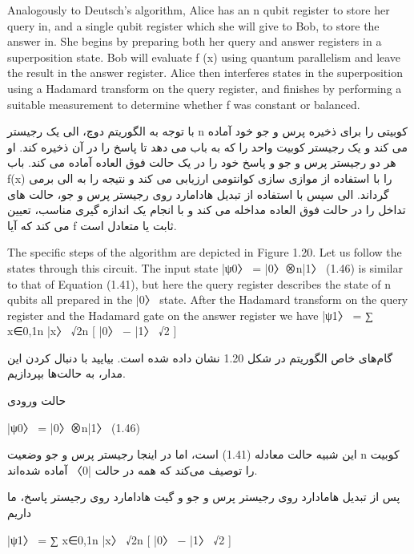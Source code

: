 \documentclass{book}
\begin{document}
	Analogously to Deutsch’s algorithm, Alice has an n qubit register to store her query
	in, and a single qubit register which she will give to Bob, to store the answer in. She
	begins by preparing both her query and answer registers in a superposition state. Bob
	will evaluate f (x) using quantum parallelism and leave the result in the answer register.
	Alice then interferes states in the superposition using a Hadamard transform on the query
	register, and finishes by performing a suitable measurement to determine whether f was
	constant or balanced.
	
	
	با توجه به الگوریتم دوچ، الی یک رجیستر n کوبیتی را برای ذخیره پرس و جو خود آماده می کند و یک رجیستر کوبیت واحد را که به باب می دهد تا پاسخ را در آن ذخیره کند. او هر دو رجیستر پرس و جو و پاسخ خود را در یک حالت فوق العاده آماده می کند. باب f(x) را با استفاده از موازی سازی کوانتومی ارزیابی می کند و نتیجه را به الی برمی گرداند. الی سپس با استفاده از تبدیل هادامارد روی رجیستر پرس و جو، حالت های تداخل را در حالت فوق العاده مداخله می کند و با انجام یک اندازه گیری مناسب، تعیین می کند که آیا f ثابت یا متعادل است.
	
	
	
	
	
	
	The specific steps of the algorithm are depicted in Figure 1.20. Let us follow the states
	through this circuit. The input state
	|ψ0〉 = |0〉⊗n|1〉 (1.46)
	is similar to that of Equation (1.41), but here the query register describes the state of n
	qubits all prepared in the |0〉 state. After the Hadamard transform on the query register
	and the Hadamard gate on the answer register we have
	|ψ1〉 = ∑
	x∈{0,1}n
	|x〉
	√2n
	[ |0〉 − |1〉
	√2
	]
	
	
	
	گام‌های خاص الگوریتم در شکل 1.20 نشان داده شده است. بیایید با دنبال کردن این مدار، به حالت‌ها بپردازیم.
	
	حالت ورودی
	
	|ψ0〉 = |0〉⊗n|1〉 (1.46)
	
	این شبیه حالت معادله (1.41) است، اما در اینجا رجیستر پرس و جو وضعیت n کوبیت را توصیف می‌کند که همه در حالت |0〉 آماده شده‌اند.
	
	پس از تبدیل هامادارد روی رجیستر پرس و جو و گیت هادامارد روی رجیستر پاسخ، ما داریم
	
	|ψ1〉 = ∑
	x∈{0,1}n
	|x〉
	√2n
	[ |0〉 − |1〉
	√2
	]
	
	
	
\end{document}
